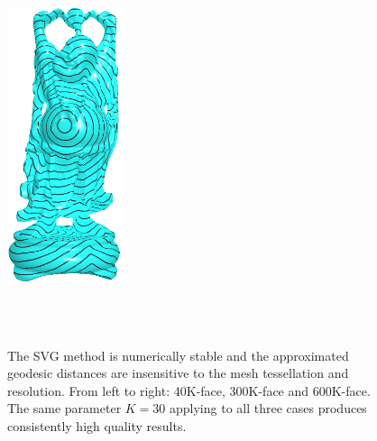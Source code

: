 \begin{figure}[htbp]
\includegraphics[width=0.3\textwidth]{figs/svg/buddha_nf600k_SVG_RMS_0_12.png}\\
 { \setlength{\fboxsep}{0pt} \setlength{\fboxrule}{1pt}}
 {   \setlength{\fboxsep}{0pt} \setlength{\fboxrule}{1pt}}
 {   \setlength{\fboxsep}{0pt}
 \setlength{\fboxrule}{1pt}}\\
\begin{scriptsize}
  \\
\end{scriptsize}
\vspace{-0.1in} \caption{The SVG method is numerically stable and
the approximated geodesic distances are insensitive to the mesh
tessellation and resolution. From left to right: 40K-face, 300K-face
and 600K-face. The same parameter $K=30$ applying to all three cases
produces consistently high quality results. } \label{fig:buddha}
\end{figure} 